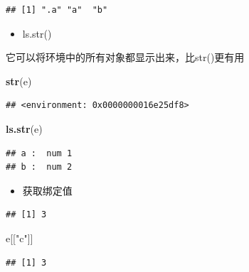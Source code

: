 \documentclass[]{book}
\newenvironment{Shaded}{\begin{snugshade}}{\end{snugshade}}
\newcommand{\KeywordTok}[1]{\textcolor[rgb]{0.13,0.29,0.53}{\textbf{#1}}}
\newcommand{\DecValTok}[1]{\textcolor[rgb]{0.00,0.00,0.81}{#1}}
\newcommand{\StringTok}[1]{\textcolor[rgb]{0.31,0.60,0.02}{#1}}
\newcommand{\OperatorTok}[1]{\textcolor[rgb]{0.81,0.36,0.00}{\textbf{#1}}}
\newcommand{\NormalTok}[1]{#1}
\providecommand{\tightlist}{%
  \setlength{\itemsep}{0pt}\setlength{\parskip}{0pt}}
\begin{document}
\begin{verbatim}
## [1] ".a" "a"  "b"
\end{verbatim}

\begin{itemize}
\tightlist
\item
  ls.str()
\end{itemize}

它可以将环境中的所有对象都显示出来，比str()更有用

\begin{Shaded}
\begin{Highlighting}[]
\KeywordTok{str}\NormalTok{(e)}
\end{Highlighting}
\end{Shaded}

\begin{verbatim}
## <environment: 0x0000000016e25df8>
\end{verbatim}

\begin{Shaded}
\begin{Highlighting}[]
\KeywordTok{ls.str}\NormalTok{(e)}
\end{Highlighting}
\end{Shaded}

\begin{verbatim}
## a :  num 1
## b :  num 2
\end{verbatim}

\begin{itemize}
\tightlist
\item
  获取绑定值
\end{itemize}

\begin{Shaded}
\end{Shaded}

\begin{verbatim}
## [1] 3
\end{verbatim}

\begin{Shaded}
\begin{Highlighting}[]
\NormalTok{e[[}\StringTok{"c"}\NormalTok{]]}
\end{Highlighting}
\end{Shaded}

\begin{verbatim}
## [1] 3
\end{verbatim}
\end{document}
